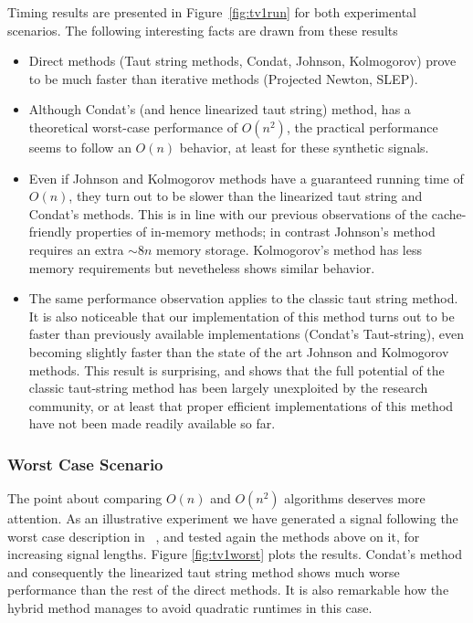\documentclass[twoside,11pt]{article}
\numberwithin{equation}{section}
\numberwithin{theorem}{section}
\begin{document}
Timing results are presented in Figure~\ref{fig:tv1run} for both experimental scenarios. The following interesting facts are drawn from these results
\begin{itemize}
 \item Direct methods (Taut string methods, Condat, Johnson, Kolmogorov) prove to be much faster than iterative methods (Projected Newton, SLEP).
 \item Although Condat's (and hence linearized taut string) method, has a theoretical worst-case performance of $O(n^2)$, the practical performance seems to follow an $O(n)$ behavior, at least for these synthetic signals.
 \item Even if Johnson and Kolmogorov methods have a guaranteed running time of $O(n)$, they turn out to be slower than the linearized taut string and Condat's methods. This is in line with our previous observations of the cache-friendly properties of in-memory methods; in contrast Johnson's method requires an extra $\sim 8n$ memory storage. Kolmogorov's method has less memory requirements but nevetheless shows similar behavior.
 \item The same performance observation applies to the classic taut string method. It is also noticeable that our implementation of this method turns out to be faster than previously available implementations (Condat's Taut-string), even becoming slightly faster than the state of the art Johnson and Kolmogorov methods. This result is surprising, and shows that the full potential of the classic taut-string method has been largely unexploited by the research community, or at least that proper efficient implementations of this method have not been made readily available so far.
\end{itemize}

\subsubsection{Worst Case Scenario}

The point about comparing $O(n)$ and $O(n^2)$ algorithms deserves more attention. As an illustrative experiment we have generated a signal following the worst case description in ~\citet{fastTV}, and tested again the methods above on it, for increasing signal lengths. Figure \ref{fig:tv1worst} plots the results. Condat's method and consequently the linearized taut string method shows much worse performance than the rest of the direct methods. It is also remarkable how the hybrid method manages to avoid quadratic runtimes in this case.
\end{document}
